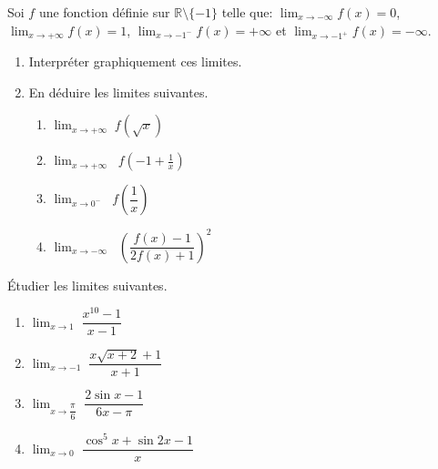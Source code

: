   \begin{exercice}
   Soi  $ f $  une fonction  définie sur $\mathbb{R}\setminus\{-1\} $ telle que: $ \displaystyle\lim_{x \to -\infty}f(x)=0 $,  $ \displaystyle\lim_{x \to +\infty}f(x)=1$,  $ \displaystyle\lim_{x \to -1^{-}}f(x)=+\infty $  et  $\displaystyle \lim_{x \to -1^{+}}f(x)=-\infty $. 
\begin{enumerate}
\item Interpréter graphiquement ces  limites.
\item  En déduire   les limites suivantes.
\begin{enumerate}
\item  $ \displaystyle\lim_{x \to+\infty}\; f\left(\sqrt{x}\right)$
\item $ \displaystyle\lim_{x \to   +\infty}\;\;f\left(-1+\frac{1}{x}\right)$
\item $\displaystyle \lim_{x \to 0^{-}}\;\;f\left(\dfrac{1}{x}\right)$
\item  $ \displaystyle\lim_{x \to -\infty}\;\;\left(\dfrac{f(x)-1}{2f(x)+1}\right)^2$
\end{enumerate}
\end{enumerate}
\end{exercice}
  \begin{exercice}
Étudier les limites suivantes.
\begin{enumerate}
\item $\displaystyle \lim_{x \to 1}\;\dfrac{x^{10}-1}{x-1} $
\item $\displaystyle  \lim_{x \to -1} \; \dfrac{x\sqrt{x+2}+1}{x+1}$
\item $ \displaystyle \lim_{x \to  \dfrac{\pi}{6}} \; \dfrac{2\sin x-1}{6x-\pi}$
\item  $ \displaystyle  \lim_{x \to 0} \; \dfrac{\cos^5 x+\sin 2x-1}{x} $ 
\end{enumerate}
\end{exercice}

